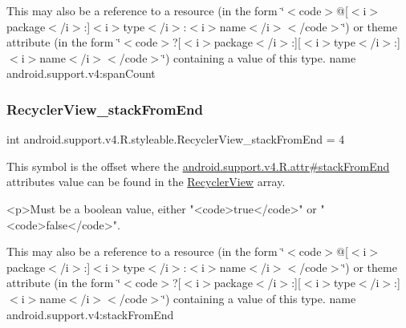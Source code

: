 This may also be a reference to a resource (in the form \char`\"{}$<$code$>$@\mbox{[}$<$i$>$package$<$/i$>$\+:\mbox{]}$<$i$>$type$<$/i$>$\+:$<$i$>$name$<$/i$>$$<$/code$>$\char`\"{}) or theme attribute (in the form \char`\"{}$<$code$>$?\mbox{[}$<$i$>$package$<$/i$>$\+:\mbox{]}\mbox{[}$<$i$>$type$<$/i$>$\+:\mbox{]}$<$i$>$name$<$/i$>$$<$/code$>$\char`\"{}) containing a value of this type.  name android.\+support.\+v4\+:span\+Count \mbox{\label{classandroid_1_1support_1_1v4_1_1R_1_1styleable_ab104a582751ed1c1f7370efc87b2d64b}} 
\subsubsection{\texorpdfstring{Recycler\+View\+\_\+stack\+From\+End}{RecyclerView\_stackFromEnd}}
{\footnotesize\ttfamily int android.\+support.\+v4.\+R.\+styleable.\+Recycler\+View\+\_\+stack\+From\+End = 4\hspace{0.3cm}{\ttfamily [static]}}

This symbol is the offset where the \hyperlink{classandroid_1_1support_1_1v4_1_1R_1_1attr_a3892c5fa02408b8236ce91dc60047e54}{android.\+support.\+v4.\+R.\+attr\#stack\+From\+End} attribute\textquotesingle{}s value can be found in the \hyperlink{classandroid_1_1support_1_1v4_1_1R_1_1styleable_ad60a429c2c839e07a58e4212d7ffeba0}{Recycler\+View} array.

\begin{DoxyVerb}      <p>Must be a boolean value, either "<code>true</code>" or "<code>false</code>".
\end{DoxyVerb}
 

This may also be a reference to a resource (in the form \char`\"{}$<$code$>$@\mbox{[}$<$i$>$package$<$/i$>$\+:\mbox{]}$<$i$>$type$<$/i$>$\+:$<$i$>$name$<$/i$>$$<$/code$>$\char`\"{}) or theme attribute (in the form \char`\"{}$<$code$>$?\mbox{[}$<$i$>$package$<$/i$>$\+:\mbox{]}\mbox{[}$<$i$>$type$<$/i$>$\+:\mbox{]}$<$i$>$name$<$/i$>$$<$/code$>$\char`\"{}) containing a value of this type.  name android.\+support.\+v4\+:stack\+From\+End \mbox{\label{classandroid_1_1support_1_1v4_1_1R_1_1styleable_a7e7d8d13fae500e42bc330c6a6214a98}} 
